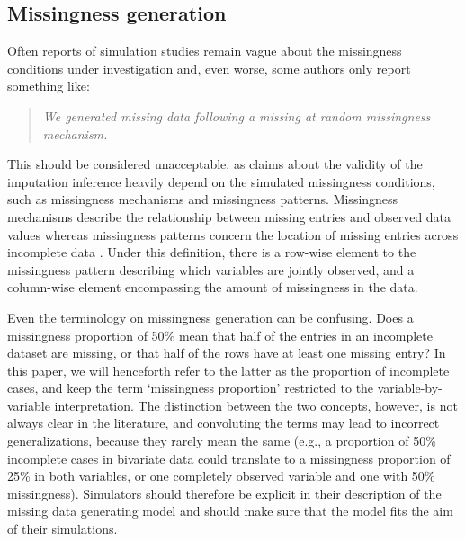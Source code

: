 \documentclass[bimj,fleqn]{w-art}
\begin{document}

\subsection{Missingness generation}

Often reports of simulation studies remain vague about the missingness conditions under investigation and, even worse, some authors only report something like:
\begin{quote}
\textit{We generated missing data following a missing at random missingness mechanism.}
\end{quote}
This should be considered unacceptable, as claims about the validity of the imputation inference heavily depend on the simulated missingness conditions, such as missingness mechanisms and missingness patterns. Missingness mechanisms describe the relationship between missing entries and observed data values whereas missingness patterns concern the location of missing entries across incomplete data \citep[][p. 8]{litt20}. Under this definition, there is a row-wise element to the missingness pattern describing which variables are jointly observed, and a column-wise element encompassing the amount of missingness in the data. 

Even the terminology on missingness generation can be confusing. Does a missingness proportion of 50\% mean that half of the entries in an incomplete dataset are missing, or that half of the rows have at least one missing entry? In this paper, we will henceforth refer to the latter as the proportion of incomplete cases, and keep the term `missingness proportion' restricted to the variable-by-variable interpretation. The distinction between the two concepts, however, is not always clear in the literature, and convoluting the terms may lead to incorrect generalizations, because they rarely mean the same (e.g., a proportion of 50\% incomplete cases in bivariate data could translate to a missingness proportion of 25\% in both variables, or one completely observed variable and one with 50\% missingness). Simulators should therefore be explicit in their description of the missing data generating model and should make sure that the model fits the aim of their simulations. 
\end{document}
